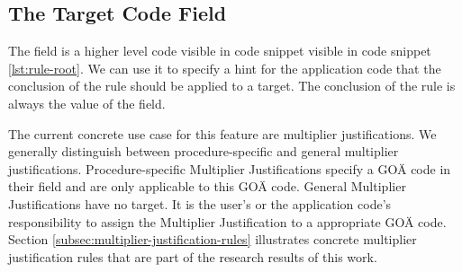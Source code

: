 \subsection{The Target Code Field}\label{subsec:the-target-code-field}
The  field is a higher level code visible in code snippet visible in code snippet \ref{lst:rule-root}.
We can use it to specify a hint for the application code that the conclusion of the rule should be applied to a target.
The conclusion of the rule is always the value of the  field.

The current concrete use case for this feature are multiplier justifications.
We generally distinguish between procedure-specific and general multiplier justifications.
Procedure-specific Multiplier Justifications specify a GOÄ code in their  field and are only applicable to this GOÄ code.
General Multiplier Justifications have no target.
It is the user's or the application code's responsibility to assign the Multiplier Justification to a appropriate GOÄ code.
Section \ref{subsec:multiplier-justification-rules} illustrates concrete multiplier justification rules that are part of the research results of this work.

